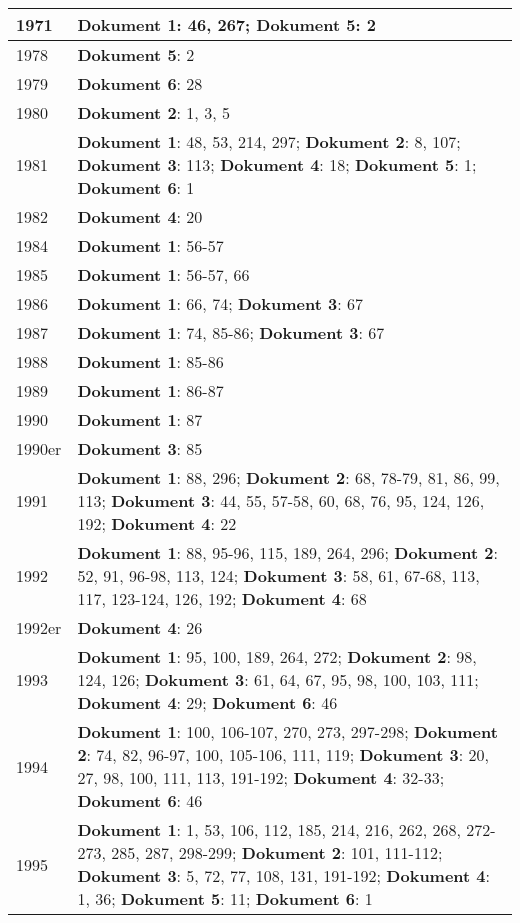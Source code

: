 \documentclass[a5paper]{article}
\begin{document}
\begin{longtable}[l]{|l|p{3in}|}
\hline
1971 & \textbf{Dokument 1}: 46, 267; \textbf{Dokument 5}: 2 \\
\hline
1978 & \textbf{Dokument 5}: 2 \\
\hline
1979 & \textbf{Dokument 6}: 28 \\
\hline
1980 & \textbf{Dokument 2}: 1, 3, 5 \\
\hline
1981 & \textbf{Dokument 1}: 48, 53, 214, 297; \textbf{Dokument 2}: 8, 107; \textbf{Dokument 3}: 113; \textbf{Dokument 4}: 18; \textbf{Dokument 5}: 1; \textbf{Dokument 6}: 1 \\
\hline
1982 & \textbf{Dokument 4}: 20 \\
\hline
1984 & \textbf{Dokument 1}: 56-57 \\
\hline
1985 & \textbf{Dokument 1}: 56-57, 66 \\
\hline
1986 & \textbf{Dokument 1}: 66, 74; \textbf{Dokument 3}: 67 \\
\hline
1987 & \textbf{Dokument 1}: 74, 85-86; \textbf{Dokument 3}: 67 \\
\hline
1988 & \textbf{Dokument 1}: 85-86 \\
\hline
1989 & \textbf{Dokument 1}: 86-87 \\
\hline
1990 & \textbf{Dokument 1}: 87 \\
\hline
1990er & \textbf{Dokument 3}: 85 \\
\hline
1991 & \textbf{Dokument 1}: 88, 296; \textbf{Dokument 2}: 68, 78-79, 81, 86, 99, 113; \textbf{Dokument 3}: 44, 55, 57-58, 60, 68, 76, 95, 124, 126, 192; \textbf{Dokument 4}: 22 \\
\hline
1992 & \textbf{Dokument 1}: 88, 95-96, 115, 189, 264, 296; \textbf{Dokument 2}: 52, 91, 96-98, 113, 124; \textbf{Dokument 3}: 58, 61, 67-68, 113, 117, 123-124, 126, 192; \textbf{Dokument 4}: 68 \\
\hline
1992er & \textbf{Dokument 4}: 26 \\
\hline
1993 & \textbf{Dokument 1}: 95, 100, 189, 264, 272; \textbf{Dokument 2}: 98, 124, 126; \textbf{Dokument 3}: 61, 64, 67, 95, 98, 100, 103, 111; \textbf{Dokument 4}: 29; \textbf{Dokument 6}: 46 \\
\hline
1994 & \textbf{Dokument 1}: 100, 106-107, 270, 273, 297-298; \textbf{Dokument 2}: 74, 82, 96-97, 100, 105-106, 111, 119; \textbf{Dokument 3}: 20, 27, 98, 100, 111, 113, 191-192; \textbf{Dokument 4}: 32-33; \textbf{Dokument 6}: 46 \\
\hline
1995 & \textbf{Dokument 1}: 1, 53, 106, 112, 185, 214, 216, 262, 268, 272-273, 285, 287, 298-299; \textbf{Dokument 2}: 101, 111-112; \textbf{Dokument 3}: 5, 72, 77, 108, 131, 191-192; \textbf{Dokument 4}: 1, 36; \textbf{Dokument 5}: 11; \textbf{Dokument 6}: 1 \\

\end{longtable}
\end{document}

